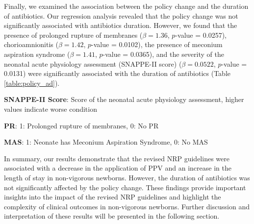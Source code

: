 \documentclass[11pt]{article}
\begin{document}
Finally, we examined the association between the policy change and the duration of antibiotics. Our regression analysis revealed that the policy change was not significantly associated with antibiotics duration. However, we found that the presence of prolonged rupture of membranes ($\beta = 1.36$, $p$-value = 0.0257), chorioamnionitis ($\beta = 1.42$, $p$-value = 0.0102), the presence of meconium aspiration syndrome ($\beta = 1.41$, $p$-value = 0.0365), and the severity of the neonatal acute physiology assessment (SNAPPE-II score) ($\beta = 0.0522$, $p$-value = 0.0131) were significantly associated with the duration of antibiotics (Table \ref{table:policy_ad}).

\begin{table}[h]
\caption{Association between policy change and Antibiotics Duration}
\label{table:policy_ad}
\begin{threeparttable}
\renewcommand{\TPTminimum}{\linewidth}
\begin{tablenotes}
\footnotesize
\item \textbf{SNAPPE-II Score}: Score of the neonatal acute physiology assessment, higher values indicate worse condition
\item \textbf{PR}: 1: Prolonged rupture of membranes, 0: No PR
\item \textbf{MAS}: 1: Neonate has Meconium Aspiration Syndrome, 0: No MAS
\end{tablenotes}
\end{threeparttable}
\end{table}


In summary, our results demonstrate that the revised NRP guidelines were associated with a decrease in the application of PPV and an increase in the length of stay in non-vigorous newborns. However, the duration of antibiotics was not significantly affected by the policy change. These findings provide important insights into the impact of the revised NRP guidelines and highlight the complexity of clinical outcomes in non-vigorous newborns. Further discussion and interpretation of these results will be presented in the following section.
\end{document}
